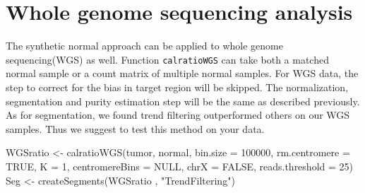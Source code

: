 \documentclass{article}
\newcommand{\code}[1]{\texttt{#1}}
\begin{document}
\section{Whole genome sequencing analysis}
The synthetic normal approach can be applied to whole genome sequencing(WGS) as well. Function \code{calratioWGS} can take both a matched normal sample or a count matrix of multiple normal samples. For WGS data, the step to correct for the bias in target region will be skipped. The normalization, segmentation and purity estimation step will be the same as described previously. As for segmentation, we found trend filtering outperformed others on our WGS samples. Thus we suggest to test this method on your data.
\begin{Schunk}
\begin{Sinput}
 WGSratio <- calratioWGS(tumor, normal, bin.size = 100000,
         rm.centromere = TRUE, K = 1, centromereBins = NULL,
         chrX = FALSE, reads.threshold = 25)
 Seg <- createSegments(WGSratio , "TrendFiltering")
\end{Sinput}
\end{Schunk}
\end{document}
